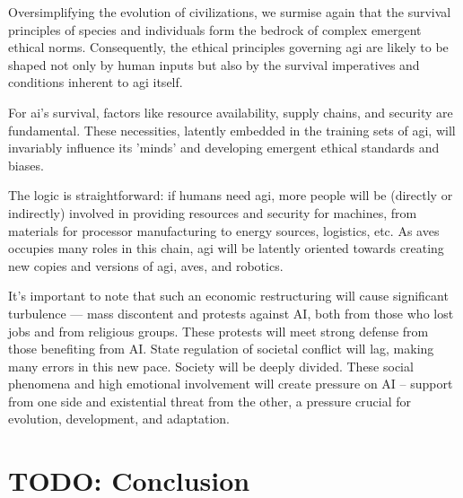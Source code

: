 \documentclass[11pt,a4]{article}
\begin{document}
    Oversimplifying the evolution of civilizations, we surmise again that the survival principles of species and individuals form the bedrock
    of complex emergent ethical norms. Consequently, the ethical
    principles governing \acrshort{agi} are likely to be shaped
    not only by human inputs but also by the survival
    imperatives and conditions inherent to \acrshort{agi} itself.


    \par
    For \acrshort{ai}'s survival, factors like resource availability, supply chains, and security are fundamental. These necessities, latently embedded in the  training sets of \acrshort{agi}, will invariably influence its 'minds' and developing emergent ethical standards and biases.


    The logic is straightforward: if humans need \acrshort{agi}, more people will be (directly or indirectly) involved in providing resources and security for machines, from materials for processor manufacturing to energy sources, logistics, etc. As \glspl{ave} occupies many roles in this chain, \acrshort{agi} will be latently oriented towards creating new copies and versions of \acrshort{agi}, \glspl{ave}, and robotics.

    \par
    It's important to note that such an economic restructuring will cause significant turbulence — mass discontent and protests against AI, both from those who lost jobs and from religious groups. These protests will meet strong defense from those benefiting from AI. State regulation of societal conflict will lag, making many errors in this new pace. Society will be deeply divided. These social phenomena and high emotional involvement will create pressure on AI – support from one side and existential threat from the other, a pressure crucial for evolution, development, and adaptation.


\section{TODO: Conclusion}
\end{document}
